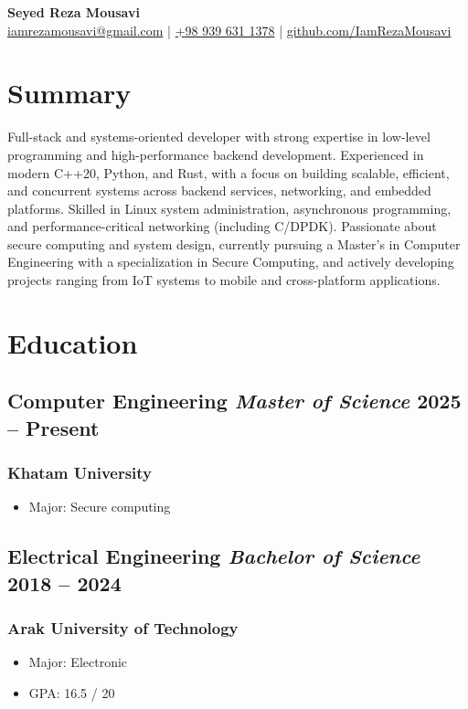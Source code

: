 \documentclass[12pt]{article}
\begin{document}
\begin{center}
  {\Huge \textbf{Seyed Reza Mousavi}} \\[6pt]
  \href{mailto:iamrezamousavi@gmail.com}{iamrezamousavi@gmail.com} \;|\;
  \href{tel:+989396311378}{+98 939 631 1378} \;|\;
  \href{https://github.com/IamRezaMousavi}{github.com/IamRezaMousavi}
\end{center}

\section{Summary}
Full-stack and systems-oriented developer with strong expertise in
low-level programming and high-performance backend development.
Experienced in modern C++20, Python, and Rust, with a focus on
building scalable,
efficient, and concurrent systems across backend services,
networking, and embedded platforms.
Skilled in Linux system administration, asynchronous programming,
and performance-critical networking (including C/DPDK).
Passionate about secure computing and system design, currently
pursuing a Master's
in Computer Engineering with a specialization in Secure Computing,
and actively developing projects ranging from IoT systems to
mobile and cross-platform applications.

\section{Education}
\subsection{
  Computer Engineering \textbar{}
  \textit{Master of Science}
  \hfill
  \footnotesize 2025 -- Present
}
\subsubsection{Khatam University}
\begin{itemize}
  \item Major: Secure computing
\end{itemize}

\subsection{
  Electrical Engineering
  \textbar{}
  \textit{Bachelor of Science}
  \hfill \footnotesize 2018 -- 2024
}
\subsubsection{Arak University of Technology}
\begin{itemize}
  \item Major: Electronic
  \item GPA: 16.5 / 20
\end{itemize}
\end{document}
